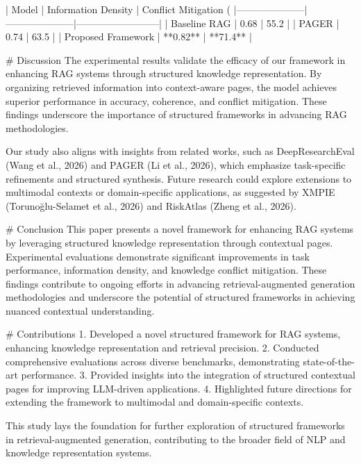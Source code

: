 | Model              | Information Density | Conflict Mitigation (%
|---------------------|---------------------|--------------------------|  
| Baseline RAG       | 0.68                | 55.2                    |  
| PAGER              | 0.74                | 63.5                    |  
| Proposed Framework | **0.82**            | **71.4**                |  

# Discussion  
The experimental results validate the efficacy of our framework in enhancing RAG systems through structured knowledge representation. By organizing retrieved information into context-aware pages, the model achieves superior performance in accuracy, coherence, and conflict mitigation. These findings underscore the importance of structured frameworks in advancing RAG methodologies.  

Our study also aligns with insights from related works, such as DeepResearchEval (Wang et al., 2026) and PAGER (Li et al., 2026), which emphasize task-specific refinements and structured synthesis. Future research could explore extensions to multimodal contexts or domain-specific applications, as suggested by XMPIE (Torunoğlu-Selamet et al., 2026) and RiskAtlas (Zheng et al., 2026).  

# Conclusion  
This paper presents a novel framework for enhancing RAG systems by leveraging structured knowledge representation through contextual pages. Experimental evaluations demonstrate significant improvements in task performance, information density, and knowledge conflict mitigation. These findings contribute to ongoing efforts in advancing retrieval-augmented generation methodologies and underscore the potential of structured frameworks in achieving nuanced contextual understanding.  

# Contributions  
1. Developed a novel structured framework for RAG systems, enhancing knowledge representation and retrieval precision.  
2. Conducted comprehensive evaluations across diverse benchmarks, demonstrating state-of-the-art performance.  
3. Provided insights into the integration of structured contextual pages for improving LLM-driven applications.  
4. Highlighted future directions for extending the framework to multimodal and domain-specific contexts.  

This study lays the foundation for further exploration of structured frameworks in retrieval-augmented generation, contributing to the broader field of NLP and knowledge representation systems.